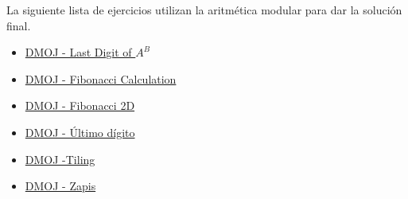 La siguiente lista de ejercicios utilizan la aritmética modular para dar la solución final.

\begin{itemize}
	
	\item \href{https://dmoj.uclv.edu.cu/problem/digitlast}{DMOJ - Last Digit of $A^B$}
	\item \href{https://dmoj.uclv.edu.cu/problem/fibonaccicalculatio}{ DMOJ - Fibonacci Calculation}
	\item \href{https://dmoj.uclv.edu.cu/problem/fibonacci}{DMOJ - Fibonacci 2D}
	\item \href{https://dmoj.uclv.edu.cu/problem/lastdigit}{DMOJ - Último dígito}
	\item \href{https://dmoj.uclv.edu.cu/problem/campipvc}{DMOJ -Tiling}
	\item \href{https://dmoj.uclv.edu.cu/problem/zapis}{DMOJ - Zapis}
\end{itemize}